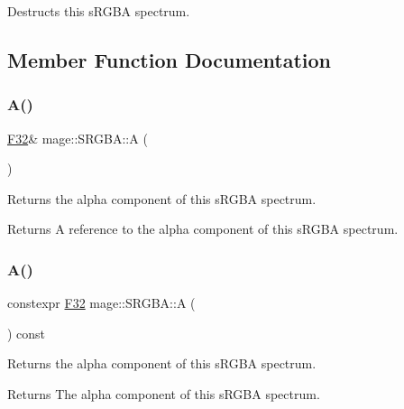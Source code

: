 Destructs this s\+R\+G\+BA spectrum. 

\subsection{Member Function Documentation}
\mbox{\label{structmage_1_1_s_r_g_b_a_abff0df62d9543624b2d1617f643c6e05}} 
\subsubsection{\texorpdfstring{A()}{A()}\hspace{0.1cm}{\footnotesize\ttfamily [1/2]}}
{\footnotesize\ttfamily \mbox{\hyperlink{namespacemage_aa97e833b45f06d60a0a9c4fc22ae02c0}{F32}}\& mage\+::\+S\+R\+G\+B\+A\+::A (\begin{DoxyParamCaption}{ }\end{DoxyParamCaption})\hspace{0.3cm}{\ttfamily [noexcept]}}

Returns the alpha component of this s\+R\+G\+BA spectrum.

\begin{DoxyReturn}{Returns}
A reference to the alpha component of this s\+R\+G\+BA spectrum. 
\end{DoxyReturn}
\mbox{\label{structmage_1_1_s_r_g_b_a_a49871e2ca373c6fb0eb7d21ad2e53900}} 
\subsubsection{\texorpdfstring{A()}{A()}\hspace{0.1cm}{\footnotesize\ttfamily [2/2]}}
{\footnotesize\ttfamily constexpr \mbox{\hyperlink{namespacemage_aa97e833b45f06d60a0a9c4fc22ae02c0}{F32}} mage\+::\+S\+R\+G\+B\+A\+::A (\begin{DoxyParamCaption}{ }\end{DoxyParamCaption}) const\hspace{0.3cm}{\ttfamily [noexcept]}}

Returns the alpha component of this s\+R\+G\+BA spectrum.

\begin{DoxyReturn}{Returns}
The alpha component of this s\+R\+G\+BA spectrum. 
\end{DoxyReturn}
\mbox{\label{structmage_1_1_s_r_g_b_a_a80ac37642fa66c167f34fa6fc6792f11}} 
